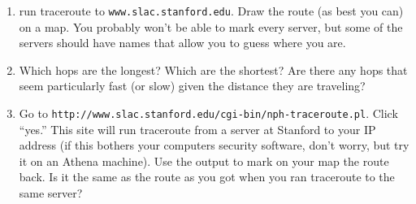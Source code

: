 \documentclass{article}
\begin{document}
\begin{enumerate}[a]

\item run traceroute to \texttt{www.slac.stanford.edu}.  Draw the route (as best you can) on a map.  You probably won't be able to mark every server, but some of the servers should have names that allow you to guess where you are.

\item Which hops are the longest?  Which are the shortest?  Are there any hops that seem particularly fast (or slow) given the distance they are traveling?

\item Go to \texttt{http://www.slac.stanford.edu/cgi-bin/nph-traceroute.pl}.  Click ``yes.'' This site will run traceroute from a server at Stanford to your IP address (if this bothers your computers security software, don't worry, but try it on an Athena machine).  Use the output to mark on your map the route back.  Is it the same as the route as you got when you ran traceroute to the same server?

\end{enumerate}
\end{document}
